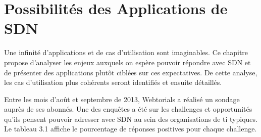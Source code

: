 
\chapter{Possibilités des Applications de SDN}


Une infinité d'applications et de cas d'utilisation sont imaginables. Ce chapitre propose d'analyser les enjeux auxquels on espère pouvoir répondre avec SDN et de présenter des applications plutôt ciblées sur ces expectatives. De cette analyse, les cas d'utilisation plus cohérents seront identifiés et ensuite détaillés.

 

Entre les mois d'août et septembre de 2013, Webtorials a réalisé un sondage auprès de ses abonnés. Une des enquêtes a été sur les challenges et opportunités qu'ils pensent pouvoir adresser avec SDN au sein des organisations de \gls{ti} typiques. Le tableau 3.1 affiche le pourcentage de réponses positives pour chaque challenge. \cite{2013GuideSDNNVUseCases}

